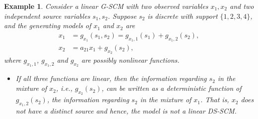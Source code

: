 \documentclass[12pt]{article}
\newtheorem{example}{Example}
\begin{document}
\begin{example}
Consider a linear G-SCM with two observed variables $x_1,x_2$ and two independent source variables $s_1,s_2$. Suppose $s_2$ is discrete with support $\{1,2,3,4\}$, and the generating models of $x_1$ and $x_2$ are
\begin{align*}
x_1 &= g_{x_1}(s_1, s_2)=g_{x_1,1}(s_1) + g_{x_1,2} (s_2), \\
x_2 &= a_{21} x_1 + g_{x_2} (s_2),
\end{align*}
where $g_{x_1,1}$, $g_{x_1,2}$ and $g_{x_2}$ are possibly nonlinear functions.






\begin{itemize}
    \item If all three functions are linear, then the information regarding $s_2$ in the mixture of $x_2$, i.e., $g_{x_2}(s_2)$, can be written as a deterministic function of $g_{x_1,2}(s_2)$, the information regarding $s_2$ in the mixture of $x_1$. That is, $x_2$ does not have a distinct source and hence, the model is not a linear DS-SCM.
    

\end{itemize}
\end{example}
\end{document}
